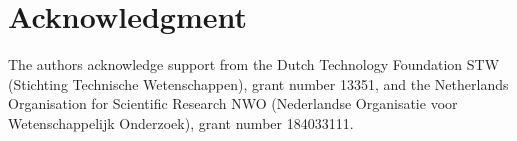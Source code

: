 \section*{Acknowledgment}
The authors acknowledge support from the Dutch Technology Foundation STW (Stichting Technische Wetenschappen), grant number 13351, and the Netherlands Organisation for Scientific Research NWO (Nederlandse Organisatie voor Wetenschappelijk Onderzoek), grant number 184033111.